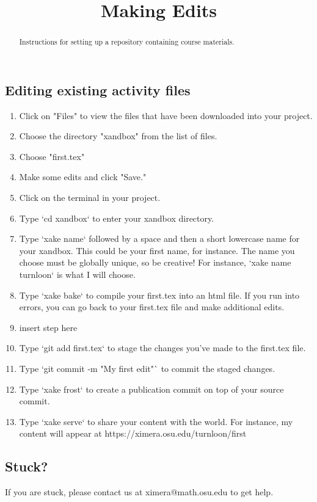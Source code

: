 \documentclass{ximera}
\title{Making Edits}
\begin{document}
\begin{abstract}
Instructions for setting up a repository containing course materials.
\end{abstract}
\maketitle


\subsection{Editing existing activity files}
\begin{enumerate}

\item Click on "Files" to view the files that have been downloaded into your project.
\item Choose the directory "xandbox" from the list of files.
\item Choose "first.tex"
\item Make some edits and click "Save."
\item Click on the terminal in your project.
\item Type `cd xandbox` to enter your xandbox directory.
\item Type `xake name` followed by a space and then a short lowercase name for your xandbox.  This could be your first name, for instance.  The name you choose must be globally unique, so be creative!  For instance, `xake name turnloon` is what I will choose.
\item Type `xake bake` to compile your first.tex into an html file.  If you run into errors, you can go back to your first.tex file and make additional edits.
\item insert step here
\item Type `git add first.tex` to stage the changes you've made to the first.tex file.
\item Type `git commit -m "My first edit"` to commit the staged changes.
\item Type `xake frost` to create a publication commit on top of your source commit.
\item Type `xake serve` to share your content with the world.  For instance, my content will appear at https://ximera.osu.edu/turnloon/first
\end{enumerate}
\subsection{Stuck?}

If you are stuck, please contact us at ximera@math.osu.edu to get help.
\end{document}
